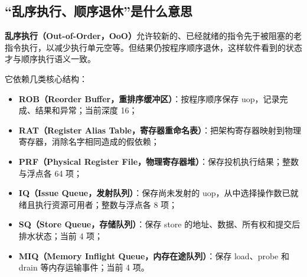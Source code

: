\documentclass[UTF8,a4paper,zihao=-4,oneside]{ctexart}
\begin{document}
\subsection{“乱序执行、顺序退休”是什么意思}

\textbf{乱序执行（Out-of-Order，OoO）}允许较新的、已经就绪的指令先于被阻塞的老指令执行，以减少执行单元空等。但结果仍按程序顺序退休，这样软件看到的状态才与顺序执行语义一致。

它依赖几类核心结构：

\begin{itemize}
  \item \textbf{ROB（Reorder Buffer，重排序缓冲区）}：按程序顺序保存 uop，记录完成、结果和异常；当前深度 16；
  \item \textbf{RAT（Register Alias Table，寄存器重命名表）}：把架构寄存器映射到物理寄存器，消除名字相同造成的假依赖；
  \item \textbf{PRF（Physical Register File，物理寄存器堆）}：保存投机执行结果；整数与浮点各 64 项；
  \item \textbf{IQ（Issue Queue，发射队列）}：保存尚未发射的 uop，从中选择操作数已就绪且执行资源可用者；整数与浮点各 8 项；
  \item \textbf{SQ（Store Queue，存储队列）}：保存 store 的地址、数据、所有权和提交后排水状态；当前 4 项；
  \item \textbf{MIQ（Memory Inflight Queue，内存在途队列）}：保存 load、probe 和 drain 等内存运输事件；当前 4 项。
\end{itemize}
\end{document}
